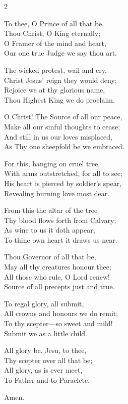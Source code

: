 \documentclass[12pt]{book}
\begin{document}





\begin{multicols}{2}
\begin{enpars}
To thee, O Prince of all that be,\\
Thou Christ, O King eternally;\\
O Framer of the mind and heart,\\
Our one true Judge we say thou art.

The wicked protest, wail and cry,\\
Christ Jesus’ reign they would deny;\\
Rejoice we at thy glorious name,\\
Thou Highest King we do proclaim.

O Christ! The Source of all our peace,\\
Make all our sinful thoughts to cease;\\
And still in us our loves misplaced,\\
As Thy one sheepfold be we embraced.

For this, hanging on cruel tree,\\
With arms outstretched, for all to see;\\
His heart is pierced by soldier’s spear,\\
Revealing burning love most dear.

From this the altar of the tree\\
Thy blood flows forth from Calvary;\\
As wine to us it doth appear,\\
To thine own heart it draws us near.

Thou Governor of all that be,\\
May all thy creatures honour thee;\\
All those who rule, O Lord renew!\\
Source of all precepts just and true.

To regal glory, all submit,\\
All crowns and honours we do remit;\\
To thy scepter—so sweet and mild!\\
Submit we as a little child.

All glory be, Jesu, to thee,\\
Thy scepter over all that be;\\
All glory, as is ever meet,\\
To Father and to Paraclete. 

Amen.
\end{enpars}
\end{multicols}
\end{document}
